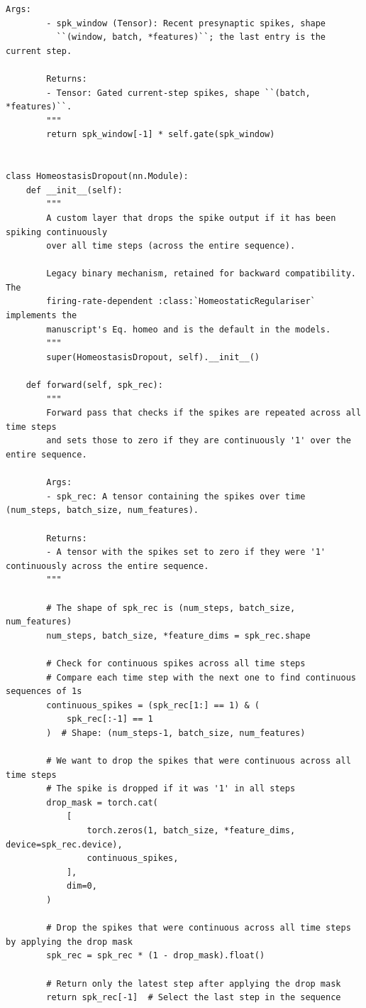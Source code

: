 \begin{lstlisting}[caption={mnn\_torch/layers.py},label={lst:mnn-src-layers}]
        Args:
        - spk_window (Tensor): Recent presynaptic spikes, shape
          ``(window, batch, *features)``; the last entry is the current step.

        Returns:
        - Tensor: Gated current-step spikes, shape ``(batch, *features)``.
        """
        return spk_window[-1] * self.gate(spk_window)


class HomeostasisDropout(nn.Module):
    def __init__(self):
        """
        A custom layer that drops the spike output if it has been spiking continuously
        over all time steps (across the entire sequence).

        Legacy binary mechanism, retained for backward compatibility. The
        firing-rate-dependent :class:`HomeostaticRegulariser` implements the
        manuscript's Eq. homeo and is the default in the models.
        """
        super(HomeostasisDropout, self).__init__()

    def forward(self, spk_rec):
        """
        Forward pass that checks if the spikes are repeated across all time steps
        and sets those to zero if they are continuously '1' over the entire sequence.

        Args:
        - spk_rec: A tensor containing the spikes over time (num_steps, batch_size, num_features).

        Returns:
        - A tensor with the spikes set to zero if they were '1' continuously across the entire sequence.
        """

        # The shape of spk_rec is (num_steps, batch_size, num_features)
        num_steps, batch_size, *feature_dims = spk_rec.shape

        # Check for continuous spikes across all time steps
        # Compare each time step with the next one to find continuous sequences of 1s
        continuous_spikes = (spk_rec[1:] == 1) & (
            spk_rec[:-1] == 1
        )  # Shape: (num_steps-1, batch_size, num_features)

        # We want to drop the spikes that were continuous across all time steps
        # The spike is dropped if it was '1' in all steps
        drop_mask = torch.cat(
            [
                torch.zeros(1, batch_size, *feature_dims, device=spk_rec.device),
                continuous_spikes,
            ],
            dim=0,
        )

        # Drop the spikes that were continuous across all time steps by applying the drop mask
        spk_rec = spk_rec * (1 - drop_mask).float()

        # Return only the latest step after applying the drop mask
        return spk_rec[-1]  # Select the last step in the sequence
\end{lstlisting}


